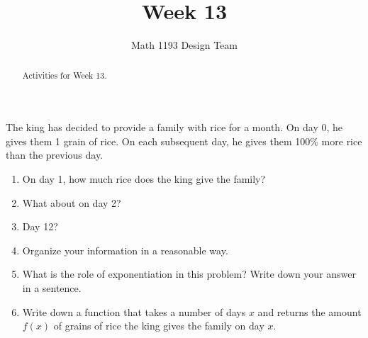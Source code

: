 \documentclass[noauthor,noinstructornotes]{ximera}
\title{Week 13}
\author{Math 1193 Design Team}
\begin{document}
\begin{abstract}
    Activities for Week 13.
\end{abstract}
\maketitle

\begin{problem}
The king has decided to provide a family with rice for a month. 
On day 0, he gives them 1 grain of rice. On each subsequent day, 
he gives them 100\% more rice than the previous day. 

\begin{enumerate}
    \item On day 1, how much rice does the king give the family?
    \item What about on day 2?
    \item Day 12?
    \item Organize your information in a reasonable way.
    \item What is the role of exponentiation in this problem? Write down
    your answer in a sentence.
    \item Write down a function that takes a number of days \(x\)
    and returns the amount \(f(x)\) of grains of rice the king gives the
    family on day \(x\).
\end{enumerate}
\end{problem}
\end{document}
